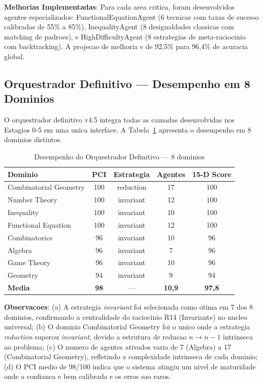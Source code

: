 \documentclass[5p]{elsarticle}
\begin{document}
\textbf{Melhorias Implementadas}: Para cada area critica, foram desenvolvidos
agentes especializados: FunctionalEquationAgent (6 tecnicas com taxas de
sucesso calibradas de 55\% a 85\%), InequalityAgent (8 desigualdades classicas
com matching de padroes), e HighDifficultyAgent (8 estrategias de meta-raciocinio
com backtracking). A projecao de melhoria e de 92,5\% para 96,4\% de acuracia
global.

\subsection{Orquestrador Definitivo — Desempenho em 8 Dominios}

O orquestrador definitivo v4.5 integra todas as camadas desenvolvidas nos
Estagios 0-5 em uma unica interface. A Tabela~\ref{tab:definitive} apresenta
o desempenho em 8 dominios distintos.

\begin{table}[H]
  \centering
  \caption{Desempenho do Orquestrador Definitivo — 8 dominios}
  \label{tab:definitive}
  \small
  \begin{tabular}{lcccc}
    \toprule
    \textbf{Dominio} & \textbf{PCI} & \textbf{Estrategia} & \textbf{Agentes} & \textbf{15-D Score} \\
    \midrule
    Combinatorial Geometry & 100 & reduction & 17 & 100 \\
    Number Theory & 100 & invariant & 12 & 100 \\
    \rowcolor{greenbg} Inequality & 100 & invariant & 10 & 100 \\
    Functional Equation & 100 & invariant & 12 & 100 \\
    Combinatorics & 96 & invariant & 10 & 96 \\
    Algebra & 96 & invariant & 7 & 96 \\
    Game Theory & 96 & invariant & 10 & 96 \\
    Geometry & 94 & invariant & 9 & 94 \\
    \midrule
    \textbf{Media} & \textbf{98} & --- & \textbf{10,9} & \textbf{97,8} \\
    \bottomrule
  \end{tabular}
\end{table}

\textbf{Observacoes}: (a) A estrategia \textit{invariant} foi selecionada como
otima em 7 dos 8 dominios, confirmando a centralidade do raciocinio R14
(Invariante) no nucleo universal; (b) O dominio Combinatorial Geometry foi o
unico onde a estrategia \textit{reduction} superou \textit{invariant}, devido
a estrutura de reducao $n\to n-1$ intrinseca ao problema; (c) O numero de
agentes ativados varia de 7 (Algebra) a 17 (Combinatorial Geometry),
refletindo a complexidade intrinseca de cada dominio; (d) O PCI medio de
98/100 indica que o sistema atingiu um nivel de maturidade onde a confianca
e bem calibrada e os erros sao raros.
\end{document}
